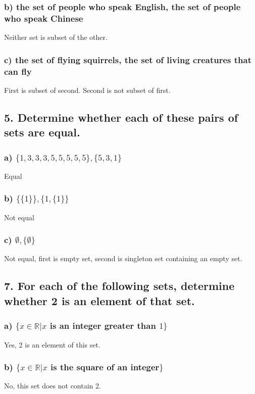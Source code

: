 \documentclass[11pt, oneside]{article} %
\numberwithin{equation}{section} %
\numberwithin{figure}{section} %
\numberwithin{table}{section} %
\begin{document}
\subsubsection{b) the set of people who speak English, the set of people who speak Chinese}
Neither set is subset of the other.
\subsubsection{c) the set of flying squirrels, the set of living creatures that can fly}
First is subset of second. Second is not subset of first.

\subsection{5. Determine whether each of these pairs of sets are equal.}
\subsubsection{a) $\{1,3,3,3,5,5,5,5,5\},\{5,3,1\}$}
Equal
\subsubsection{b) $\{\{1\}\},\{1,\{1\}\}$}
Not equal
\subsubsection{c) $\emptyset,\{\emptyset\}$}
Not equal, first is empty set, second is singleton set containing an empty set.

\subsection{7. For each of the following sets, determine whether 2 is an element of that set.}
\subsubsection{a) $\{x \in \mathbb{R}|x$ is an integer greater than $1\}$}
Yes, 2 is an element of this set.
\subsubsection{b) $\{x \in \mathbb{R}|x$ is the square of an integer$\}$}
No, this set does not contain 2.
\end{document}
